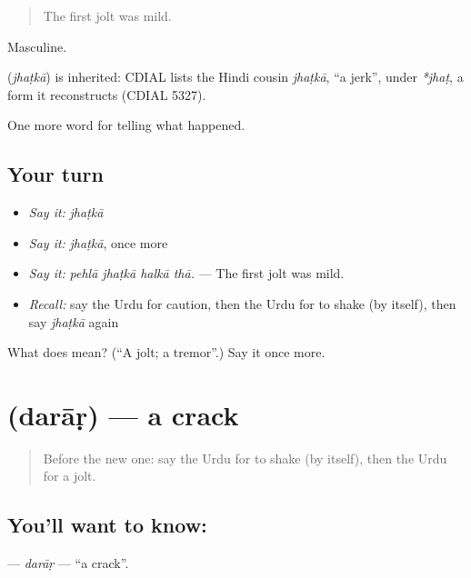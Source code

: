 \begin{quote}
The first jolt was mild.
\end{quote}

Masculine.

\begin{cousinweb}
\textbf{} (\emph{jhaṭkā}) is inherited: CDIAL lists the Hindi cousin \emph{jhaṭkā}, \textquotedblleft{}a jerk\textquotedblright{}, under \emph{*jhaṭ}, a form it reconstructs (CDIAL 5327).
\end{cousinweb}

\begin{grammarlens}[title={What you've built}]
One more word for telling what happened.
\end{grammarlens}

\subsection*{Your turn}
\begin{itemize}
\raggedright
  \item \emph{Say it:} \emph{jhaṭkā}
  \item \emph{Say it:} \emph{jhaṭkā}, once more
  \item \emph{Say it:} \emph{pehlā jhaṭkā halkā thā.} — The first jolt was mild.
  \item \emph{Recall:} say the Urdu for caution, then the Urdu for to shake (by itself), then say \emph{jhaṭkā} again
\end{itemize}

\begin{tcolorbox}[breakable,colback=teal!4,colframe=teal!35!black,title={Before you move on}]
What does  mean? (\textquotedblleft{}A jolt; a tremor\textquotedblright{}.) Say it once more.
\end{tcolorbox}
\section[\texorpdfstring{\ur{دراڑ} (darāṛ)}{دراڑ (darāṛ)}]{ (darāṛ) — a crack}

\label{lesson:UR-C291-darar}



\begin{quote}
Before the new one: say the Urdu for to shake (by itself), then the Urdu for a jolt.
\end{quote}

\subsection*{You'll want to know: }
\textbf{} — \emph{darāṛ} — \textquotedblleft{}a crack\textquotedblright{}.

